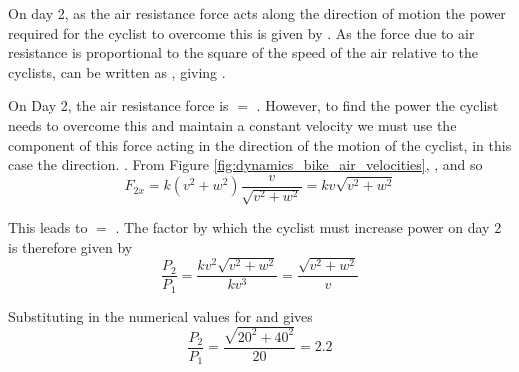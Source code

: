 \begin{problem}
{\begin{enumerate}
On day 2, as the air resistance force acts along the direction of motion the power required for the cyclist to overcome this is given by . As the force due to air resistance is proportional to the square of the speed of the air relative to the cyclists,  can be written as , giving .

On Day 2, the air resistance force is  $=$ . However, to find the power the cyclist needs to overcome this and maintain a constant velocity we must use the component of this force acting in the direction of the motion of the cyclist, in this case the   direction. . From Figure  \ref{fig:dynamics_bike_air_velocities}, , and so 
\begin{equation} 
F_{2x} = k (v^2 + w^2) \frac{v}{\sqrt{v^2 + w^2}} = kv \sqrt{v^2 + w^2}  
\end{equation}

This leads to  $=$ . The factor by which the cyclist must increase power on day 2 is therefore given by
\begin{equation} 
\frac{P_2}{P_1} = \frac{ kv^2 \sqrt{v^2 + w^2}}{k v^3} = \frac{ \sqrt{v^2 + w^2}}{v}
\end{equation}

Substituting in the numerical values for  and  gives  
\begin{equation}
\frac{P_2}{P_1}= \frac{ \sqrt{20^2 + 40^2}}{20} = 2.2
\end{equation}


\end{enumerate}
}
\end{problem}
%


